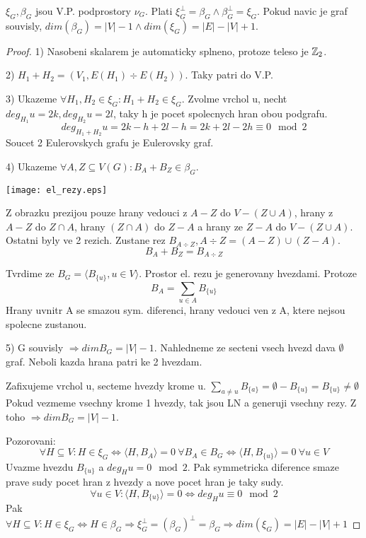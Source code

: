 \begin{theorem}
	$\xi_G, \beta_G$ jsou V.P. podprostory $\nu_G$. Plati $\xi_G^{\perp} = \beta_G \land \beta_G^{\perp} = \xi_G$. Pokud navic je graf souvisly, $dim(\beta_G) = |V| - 1 \land dim(\xi_G) = |E| - |V| + 1$.
\end{theorem}
\begin{proof}
	1) Nasobeni skalarem je automaticky splneno, protoze teleso je $\operatorname{\mathbb{Z}}_2$.

	2) $H_1 + H_2 = (V_1, E(H_1) \div E(H_2))$. Taky patri do V.P.

	3) Ukazeme $\forall H_1, H_2 \in \xi_G: H_1 + H_2 \in \xi_G$. Zvolme vrchol u, necht $deg_{H_1} u = 2k, deg_{H_2} u = 2l$, taky h je pocet spolecnych hran obou podgrafu.
	\[ deg_{H_1 + H_2} u = 2k - h + 2l - h = 2k + 2l - 2h \equiv 0 \mod2 \]
	Soucet 2 Eulerovskych grafu je Eulerovsky graf.

	4) Ukazeme $\forall A,Z \subseteq V(G): B_A + B_Z \in \beta_G$.

	\texttt{[image: el\_rezy.eps]}

	Z obrazku prezijou pouze hrany vedouci z $A - Z$ do $V - (Z\cup A)$, hrany z $A - Z$ do $Z \cap A$, hrany $(Z \cap A)$ do $Z - A$ a hrany ze $Z - A$ do $V - (Z\cup A)$. Ostatni byly ve 2 rezich. Zustane rez $B_{A \div Z}, A \div Z = (A - Z) \cup (Z - A)$.
	\[ B_A + B_Z = B_{A \div Z}\]

	Tvrdime ze $B_G = \langle B_{\{u\}}, u \in V \rangle$. Prostor el. rezu je generovany hvezdami. Protoze
	\[ B_A = \sum_{u \in A} B_{\{u\}} \]
	Hrany uvnitr A se smazou sym. diferenci, hrany vedouci ven z A, ktere nejsou spolecne zustanou.

	5) G souvisly $\Rightarrow dim B_G = |V| - 1$. Nahledneme ze secteni vsech hvezd dava $\emptyset$ graf. Neboli kazda hrana patri ke 2 hvezdam.

	Zafixujeme vrchol u, secteme hvezdy krome u. $ \sum_{a \ne u} B_{\{a\}} = \emptyset - B_{\{u\}} = B_{\{u\}} \ne \emptyset $
	Pokud vezmeme vsechny krome 1 hvezdy, tak jsou LN a generuji vsechny rezy. Z toho $\Rightarrow dim B_G = |V| - 1$.

	Pozorovani:
	\[ \forall H \subseteq V: H \in \xi_G \iff \langle H, B_A \rangle = 0 \ \forall B_A \in B_G \iff \langle H, B_{\{u\}} \rangle = 0 \ \forall u \in V \]
	Uvazme hvezdu $B_{\{u\}}$ a $deg_H u = 0 \mod2$. Pak symmetricka diference smaze prave sudy pocet hran z hvezdy a nove pocet hran je taky sudy.
	\[ \forall u \in V: \langle H, B_{\{u\}} \rangle = 0 \iff deg_H u \equiv 0 \mod2 \]
		Pak $ \forall H \subseteq V: H \in \xi_G \iff H \in \beta_G \Rightarrow \xi_G^{\perp} = (\beta_G^{})^{\perp} = \beta_G \Rightarrow dim(\xi_G) = |E| - |V| + 1 $

\end{proof}
